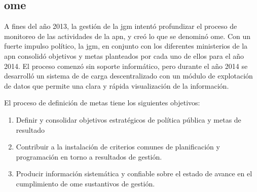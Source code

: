 

\subsection{\acrlong{ome}}

A fines del año 2013, la gestión de la \ac{jgm} intentó profundizar el proceso de monitoreo de las actividades de la \ac{apn}, y creó lo que se denominó \acrfull{ome}. Con un fuerte impulso político, la \ac{jgm}, en conjunto con los diferentes ministerios de la \ac{apn} consolidó objetivos y metas planteados por cada uno de ellos para el año 2014. El proceso comenzó sin soporte informático, pero durante el año 2014 se desarrolló un sistema de de carga descentralizado con un módulo de explotación de datos que permite una clara y rápida visualización de la información.

El proceso de definición de metas tiene los siguientes objetivos:
    \begin{enumerate}
        \item Definir y consolidar objetivos estratégicos de política pública y metas de resultado
        \item Contribuir a la instalación de criterios comunes de planificación y programación en torno a resultados de gestión.
        \item Producir información sistemática y confiable sobre el estado de avance en el cumplimiento de \ac{ome} sustantivos de gestión.
    \end{enumerate}
    
